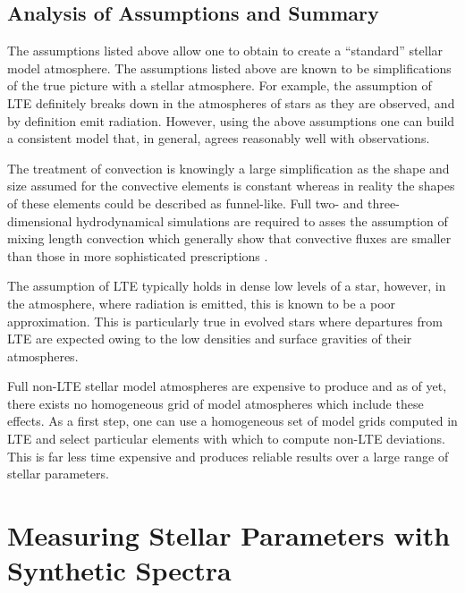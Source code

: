 

\subsection{Analysis of Assumptions and Summary} %
\label{sub:assumptions_summary}

The assumptions listed above allow one to obtain to create a ``standard'' stellar model atmosphere.
The assumptions listed above are known to be simplifications of the true picture with a stellar atmosphere.
For example, the assumption of LTE definitely breaks down in the atmospheres of stars as they are observed, and by definition emit radiation.
However, using the above assumptions one can build a consistent model that, in general, agrees reasonably well with observations.

The treatment of convection is knowingly a large simplification as the shape and size assumed for the convective elements is constant whereas in reality the shapes of these elements could be described as funnel-like.
Full two- and three-dimensional hydrodynamical simulations are required to asses the assumption of mixing length convection which generally show that convective fluxes are smaller than those in more sophisticated prescriptions
\citep{2012sse..book.....K}.

The assumption of LTE typically holds in dense low levels of a star, however, in the atmosphere, where radiation is emitted, this is known to be a poor approximation.
This is particularly true in evolved stars where departures from LTE are expected owing to the low densities and surface gravities of their atmospheres.

Full non-LTE stellar model atmospheres are expensive to produce and as of yet, there exists no homogeneous grid of model atmospheres which include these effects.
As a first step, one can use a homogeneous set of model grids computed in LTE and select particular elements with which to compute non-LTE deviations.
This is far less time expensive and produces reliable results over a large range of stellar parameters.




\section{Measuring Stellar Parameters with Synthetic Spectra} %
\label{sub:model_grid}

